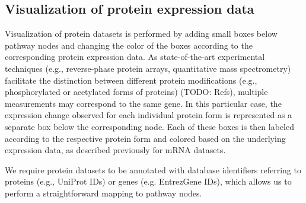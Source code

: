 \documentclass{bioinfo}
\begin{document}
\subsection{Visualization of protein expression data}

Visualization of protein datasets is performed by adding small boxes below pathway nodes and
changing the color of the boxes according to the corresponding protein expression data. As state-of-the-art
experimental techniques (e.g., reverse-phase protein arrays, quantitative mass spectrometry)
facilitate the distinction between different protein modifications (e.g., phosphorylated or
acetylated forms of proteins) (TODO: Refs), multiple measurements may correspond to the same gene.
In this particular case, the expression change observed for each individual protein form is represented
as a separate box below the corresponding node. Each of these boxes is then labeled according to the
respective protein form and colored based on the underlying expression data, as described previously
for mRNA datasets.

We require protein datasets to be annotated with database identifiers referring to proteins (e.g.,
UniProt IDs) or genes (e.g. EntrezGene IDs), which allows us to perform a straightforward mapping to
pathway nodes.
\end{document}
